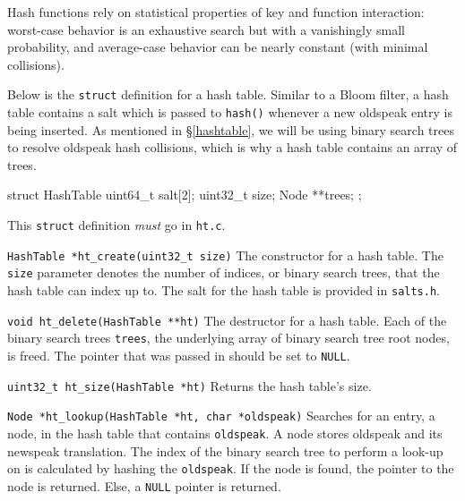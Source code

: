 Hash functions rely on statistical properties of key and function
interaction: worst-case behavior is an exhaustive search but with a
vanishingly small probability, and average-case behavior can be nearly
constant (with minimal collisions).

Below is the \texttt{struct} definition for a hash table. Similar to a
Bloom filter, a hash table contains a salt which is passed to
\texttt{hash()} whenever a new oldspeak entry is being inserted. As
mentioned in \S\ref{hashtable}, we will be using binary search trees to
resolve oldspeak hash collisions, which is why a hash table contains an
array of trees.

\begin{clisting}{}
struct HashTable {
  uint64_t salt[2];
  uint32_t size;
  Node **trees;
};
\end{clisting}

This \texttt{struct} definition \emph{must} go in \texttt{ht.c}.

\begin{funcdoc}{\texttt{HashTable *ht\_create(uint32\_t size)}}
  The constructor for a hash table. The \texttt{size} parameter denotes
  the number of indices, or binary search trees, that the hash table can
  index up to. The salt for the hash table is provided in
  \texttt{salts.h}.
\end{funcdoc}

\begin{funcdoc}{\texttt{void ht\_delete(HashTable **ht)}}
  The destructor for a hash table. Each of the binary search trees
  \texttt{trees}, the underlying array of binary search tree root nodes,
  is freed. The pointer that was passed in should be set to
  \texttt{NULL}.
\end{funcdoc}

\begin{funcdoc}{\texttt{uint32\_t ht\_size(HashTable *ht)}}
  Returns the hash table's size.
\end{funcdoc}

\begin{funcdoc}{\texttt{Node *ht\_lookup(HashTable *ht, char *oldspeak)}}
  Searches for an entry, a node, in the hash table that contains
  \texttt{oldspeak}. A node stores oldspeak and its newspeak
  translation. The index of the binary search tree to perform a look-up
  on is calculated by hashing the \texttt{oldspeak}. If the node is
  found, the pointer to the node is returned. Else, a \texttt{NULL}
  pointer is returned.
\end{funcdoc}

